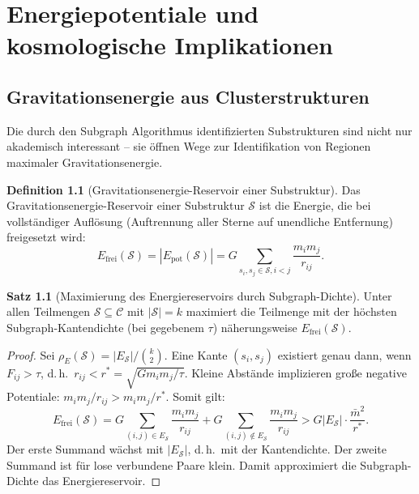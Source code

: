 ﻿\documentclass[a4paper,12pt]{report}
\theoremstyle{definition}
\newtheorem{definition}{Definition}
\newtheorem{satz}{Satz}
\begin{document}
\chapter{Energiepotentiale und kosmologische Implikationen}

\section{Gravitationsenergie aus Clusterstrukturen}

Die durch den Subgraph Algorithmus identifizierten Substrukturen sind nicht nur akademisch interessant -- sie öffnen Wege zur Identifikation von Regionen maximaler Gravitationsenergie.

\begin{definition}[Gravitationsenergie-Reservoir einer Substruktur]
Das Gravitationsenergie-Reservoir einer Substruktur $\mathcal{S}$ ist die Energie, die bei vollständiger Auflösung (Auftrennung aller Sterne auf unendliche Entfernung) freigesetzt wird:
\[
E_\mathrm{frei}(\mathcal{S}) = |E_\mathrm{pot}(\mathcal{S})| = G \sum_{s_i, s_j \in \mathcal{S}, i < j} \frac{m_i m_j}{r_{ij}}.
\]
\end{definition}

\begin{satz}[Maximierung des Energiereservoirs durch Subgraph-Dichte]
\label{satz:energiereservoir}
Unter allen Teilmengen $\mathcal{S} \subseteq \mathcal{C}$ mit $|\mathcal{S}| = k$ maximiert die Teilmenge mit der höchsten Subgraph-Kantendichte (bei gegebenem $\tau$) näherungsweise $E_\mathrm{frei}(\mathcal{S})$.
\end{satz}

\begin{proof}
Sei $\rho_E(\mathcal{S}) = |E_\mathcal{S}| / \binom{k}{2}$. Eine Kante $(s_i, s_j)$ existiert genau dann, wenn $F_{ij} > \tau$, d.\,h.\ $r_{ij} < r^* = \sqrt{G m_i m_j / \tau}$. Kleine Abstände implizieren große negative Potentiale: $m_i m_j / r_{ij} > m_i m_j / r^*$. Somit gilt:
\[
E_\mathrm{frei}(\mathcal{S}) = G \sum_{(i,j) \in E_\mathcal{S}} \frac{m_i m_j}{r_{ij}} + G \sum_{(i,j) \notin E_\mathcal{S}} \frac{m_i m_j}{r_{ij}} > G |E_\mathcal{S}| \cdot \frac{\bar{m}^2}{r^*}.
\]
Der erste Summand wächst mit $|E_\mathcal{S}|$, d.\,h.\ mit der Kantendichte. Der zweite Summand ist für lose verbundene Paare klein. Damit approximiert die Subgraph-Dichte das Energiereservoir.
\end{proof}
\end{document}
